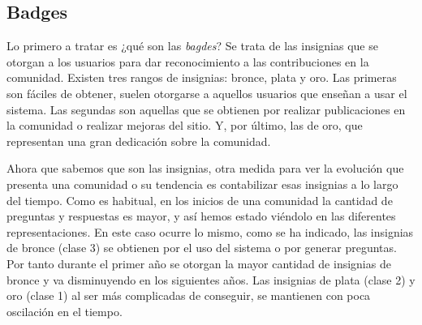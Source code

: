\documentclass[a4paper, 12pt]{book}
\begin{document}


%
%



\subsection{Badges}

Lo primero a tratar es ¿qué son las \emph{bagdes}? Se trata de las insignias que se otorgan a los usuarios para dar reconocimiento a las contribuciones en la comunidad. 
Existen tres rangos de insignias: bronce, plata y oro. Las primeras son fáciles de obtener, suelen otorgarse a aquellos usuarios que enseñan a usar el sistema. Las segundas son aquellas que se obtienen por realizar publicaciones en la comunidad o realizar mejoras del sitio. Y, por último, las de oro, que representan una gran dedicación sobre la comunidad. 

Ahora que sabemos que son las insignias, otra medida para ver la evolución que presenta una comunidad o su tendencia es contabilizar esas insignias a lo largo del tiempo. Como es habitual, en los inicios de una comunidad la cantidad de preguntas y respuestas es mayor, y así hemos estado viéndolo en las diferentes representaciones. En este caso ocurre lo mismo, como se ha indicado, las insignias de bronce (clase 3) se obtienen por el uso del sistema o por generar preguntas. Por tanto durante el primer año se otorgan la mayor cantidad de insignias de bronce y va disminuyendo en los siguientes años. Las insignias de plata (clase 2) y oro (clase 1) al ser más complicadas de conseguir, se mantienen con poca oscilación en el tiempo. 
\medskip
\end{document}
